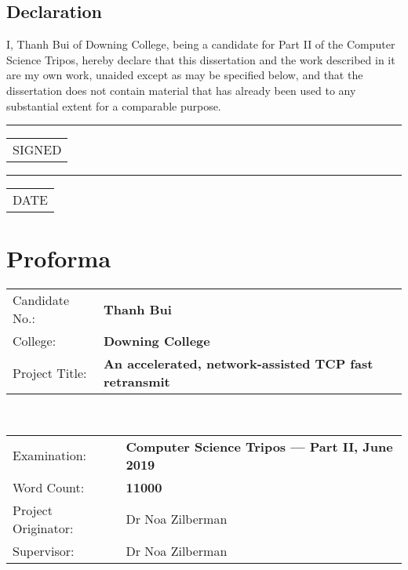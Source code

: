 \section*{Declaration}

I, Thanh Bui of Downing College, being a candidate for Part II of the Computer Science Tripos, hereby declare that this dissertation and the work described in it are my own work, unaided except as may be specified below, and that the dissertation does not contain material that has already been used to any substantial extent for a comparable purpose.

\begin{minipage}[t]{0.4\textwidth}
	\vspace*{1.5cm}  %
	\hrule
	\vspace{1mm} %
	\begin{tabular}[t]{l}
		SIGNED
	\end{tabular}
\end{minipage} 
\hspace{2cm}
\begin{minipage}[t]{0.4\textwidth}
	\vspace*{1.5cm}  %
	\hrule
	\vspace{1mm} %
	\begin{tabular}[t]{l}
		DATE
	\end{tabular}
\end{minipage}

\chapter*{Proforma}

{\large
\begin{tabular}{ l@{\hskip 3.25em} p{11cm}}
	Candidate No.:               & \bf Thanh Bui \\
	College:            & \bf Downing College \\
	Project Title:      & \bf An accelerated, network-assisted TCP fast retransmit \\
\end{tabular}
}
\\
{\large
\begin{tabular}{ l p{11.5cm}}
	Examination:        & \bf Computer Science Tripos --- Part II, June 2019  \\
	Word Count:         & \bf 11000\footnotemark	 \\
	Project Originator: & Dr Noa Zilberman               \\
	Supervisor:         & Dr Noa Zilberman             		\\ 
\end{tabular}
}

